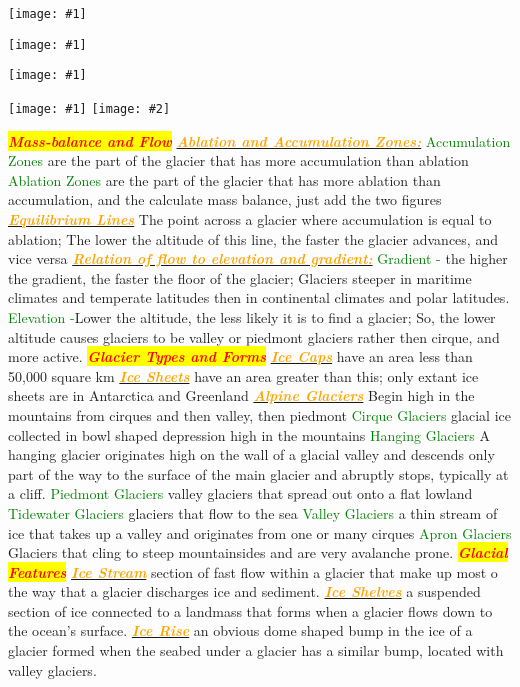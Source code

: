 \documentclass{article}
\newcommand{\red}[1]{\textcolor{red}{#1}}
\newcommand{\green}[1]{\textcolor{green}{#1}}
\newcommand{\orange}[1]{\textcolor{orange}{#1}}
\newcommand{\mysection}[1]{\colorbox{yellow}{{\textbf{\textbf{\textit{\red{#1}}}}}}}
\newcommand{\mysub}[1]{\underline{\textbf{{\textit{\orange{#1}}}}}}
\newcommand{\mysubsub}[1]{{{\green{#1}}}}
\newcommand{\fig}[1]{
	\texttt{[image: \#1]}
}
\newcommand{\figwidth}[2]{
	\texttt{[image: \#1]}
}
\newcommand{\figtwo}[2]{
	\texttt{[image: \#1]}
	\texttt{[image: \#2]}
}
\begin{document}
\begin{multicols*}{4}
	    \fig{hydrology}
	    \fig{landforms}
        \figwidth{moraines}{6}
        \figtwo{glacierflow2}{Larsen_contours}
	\mysection{Mass-balance and Flow}
		\mysub{Ablation and Accumulation Zones:}
		\mysubsub{Accumulation Zones} are the part of the glacier that has more accumulation than ablation
		\mysubsub{Ablation Zones} are the part of the glacier that has more ablation than accumulation, and the calculate mass balance, just add the two figures
		\mysub{Equilibrium Lines} The point across a glacier where accumulation is equal to ablation; The lower the altitude of this line, the faster the glacier advances, and vice versa
		\mysub{Relation of flow to elevation and gradient:}
		\mysubsub{Gradient -} the higher the gradient, the faster the floor of the glacier; Glaciers steeper in maritime climates and temperate latitudes then in continental climates and polar latitudes.
		\mysubsub{Elevation -}Lower the altitude, the less likely it is to find a glacier; So, the lower altitude causes glaciers to be valley or piedmont glaciers rather then cirque, and more active.
		\mysection{Glacier Types and Forms}
		\mysub{Ice Caps} have an area less than 50,000 square km
		\mysub{Ice Sheets} have an area greater than this; only extant ice sheets are in Antarctica and Greenland
		\mysub{Alpine Glaciers} Begin high in the mountains from cirques and then valley, then piedmont
		\mysubsub{Cirque Glaciers} glacial ice collected in bowl shaped depression high in the mountains 
		\mysubsub{Hanging Glaciers}  A hanging glacier originates high on the wall of a glacial valley and descends only part of the way to the surface of the main glacier and abruptly stops, typically at a cliff.
		\mysubsub{Piedmont Glaciers} valley glaciers that spread out onto a flat lowland
		\mysubsub{Tidewater Glaciers} glaciers that flow to the sea
		\mysubsub{Valley Glaciers} a thin stream of ice that takes up a valley and originates from one or many cirques
		\mysubsub{Apron Glaciers} Glaciers that cling to steep mountainsides and are very avalanche prone.
	    \mysection{Glacial Features}  
	    \mysub{Ice Stream} section of fast flow within a glacier that make up most o the way that a glacier discharges ice and sediment.
		\mysub{Ice Shelves} a suspended section of ice connected to a landmass that forms when a glacier flows down to the ocean’s surface.
		\mysub{Ice Rise} an obvious dome shaped bump in the ice of a glacier formed when the seabed under a glacier has a similar bump, located with valley glaciers.

\end{multicols*}
\end{document}
